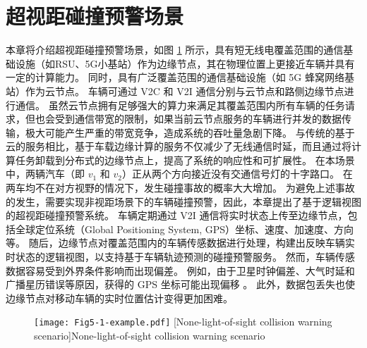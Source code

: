\section{超视距碰撞预警场景}\label{section 5-2}

本章将介绍超视距碰撞预警场景，如图 \ref{fig 5-1} 所示，具有短无线电覆盖范围的通信基础设施（如RSU、5G小基站）作为边缘节点，其在物理位置上更接近车辆并具有一定的计算能力。
同时，具有广泛覆盖范围的通信基础设施（如 5G 蜂窝网络基站）作为云节点。
车辆可通过 V2C 和 V2I 通信分别与云节点和路侧边缘节点进行通信。
虽然云节点拥有足够强大的算力来满足其覆盖范围内所有车辆的任务请求，但也会受到通信带宽的限制，如果当前云节点服务的车辆进行并发的数据传输，极大可能产生严重的带宽竞争，造成系统的吞吐量急剧下降。
与传统的基于云的服务相比，基于车载边缘计算的服务不仅减少了无线通信时延，而且通过将计算任务卸载到分布式的边缘节点上，提高了系统的响应性和可扩展性。
在本场景中，两辆汽车（即 $v_1$ 和 $v_2$）正从两个方向接近没有交通信号灯的十字路口。
在两车均不在对方视野的情况下，发生碰撞事故的概率大大增加。
为避免上述事故的发生，需要实现非视距场景下的车辆碰撞预警，因此，本章提出了基于逻辑视图的超视距碰撞预警系统。
车辆定期通过 V2I 通信将实时状态上传至边缘节点，包括全球定位系统（Global Positioning System, GPS）坐标、速度、加速度、方向等。
随后，边缘节点对覆盖范围内的车辆传感数据进行处理，构建出反映车辆实时状态的逻辑视图，以支持基于车辆轨迹预测的碰撞预警服务。
然而，车辆传感数据容易受到外界条件影响而出现偏差。
例如，由于卫星时钟偏差、大气时延和广播星历错误等原因，获得的 GPS 坐标可能出现偏移 \cite{liu2013improving}。
此外，数据包丢失也使边缘节点对移动车辆的实时位置估计变得更加困难。

\begin{figure}[h]
	\centering
	\texttt{[image: Fig5-1-example.pdf]}
	[None-light-of-sight collision warning scenario]{None-light-of-sight collision warning scenario}
	\label{fig 5-1}
\end{figure}

